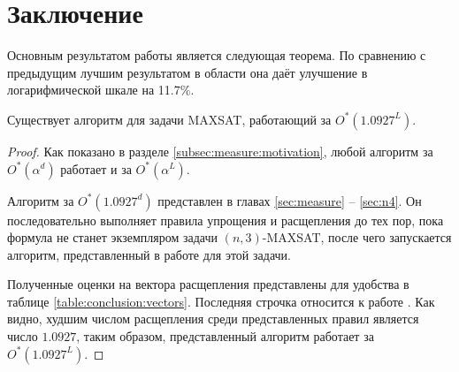 
\section*{Заключение}
\label{sec:conclusion}

Основным результатом работы является следующая теорема. По сравнению с предыдущим лучшим результатом в области \cite{bansal99} она даёт улучшение в логарифмической шкале на 11.7\%.

\setcounter{section}{5}
\setcounter{lemma}{0}
\begin{theorem}
 Существует алгоритм для задачи MAXSAT, работающий за $O^*(1.0927^L)$.
\end{theorem}

\begin{proof}
 Как показано в разделе \ref{subsec:measure:motivation}, любой алгоритм за $O^*(\alpha^d)$ работает и за $O^*(\alpha^L)$.

 Алгоритм за $O^*(1.0927^d)$ представлен в главах \ref{sec:measure} -- \ref{sec:n4}. Он последовательно выполняет правила упрощения и расщепления до тех пор, пока формула не станет экземпляром задачи $(n,3)$-MAXSAT, после чего запускается алгоритм, представленный в работе \cite{belova18} для этой задачи.

 Полученные оценки на вектора расщепления представлены для удобства в таблице \ref{table:conclusion:vectors}. Последняя строчка относится к работе \cite{belova18}. Как видно, худшим числом расщепления среди представленных правил является число $1.0927$, таким образом, представленный алгоритм работает за $O^*(1.0927^L)$.
\end{proof}

